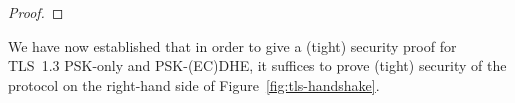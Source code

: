 \begin{proof}
	
\end{proof}

We have now established that in order to give a (tight) security proof for TLS~1.3 PSK-only and PSK-(EC)DHE, it suffices to prove (tight) security of the protocol on the right-hand side of Figure~\ref{fig:tls-handshake}. 



